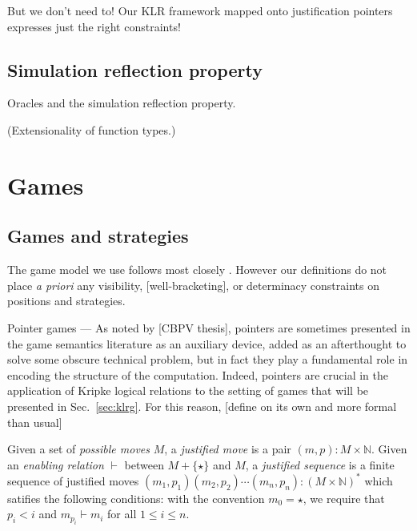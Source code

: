 \documentclass[acmsmall,anonymous]{acmart}
\begin{document}
But we don't need to!
Our KLR framework
mapped onto justification pointers
expresses just the right constraints!


\subsection{Simulation reflection property} %

Oracles and the simulation reflection property.

(Extensionality of function types.)



\newpage
\section{Games} %

\subsection{Games and strategies} %

The game model we use follows most closely \citep{gamesem99}.
However our definitions
do not place \emph{a priori}
any visibility, [well-bracketing], or determinacy
constraints on positions and strategies.

Pointer games ---
As noted by [CBPV thesis],
pointers are sometimes presented in the game semantics literature
as an auxiliary device,
added as an afterthought to solve some obscure technical problem,
but in fact they play a fundamental role
in encoding the structure of the computation.
Indeed,
pointers are crucial in the
application of Kripke logical relations
to the setting of games
that will be presented in Sec.~\ref{sec:klrg}.
For this reason,
[define on its own and more formal than usual]

\begin{definition}
Given a set of \emph{possible moves} $M$,
a \emph{justified move}
is a pair $(m, p) : M \times \mathbb{N}$.
Given an \emph{enabling relation} $\vdash$ between $M + \{\star\}$ and $M$,
a \emph{justified sequence}
is a finite sequence of justified moves
$(m_1, p_1) (m_2, p_2) \cdots (m_n, p_n) : (M \times \mathbb{N})^*$
which satifies the following conditions:
with the convention $m_0 = \star$, we require that
$p_i < i$ and $m_{p_i} \vdash m_i$ for all $1 \le i \le n$.
\end{definition}
\end{document}
